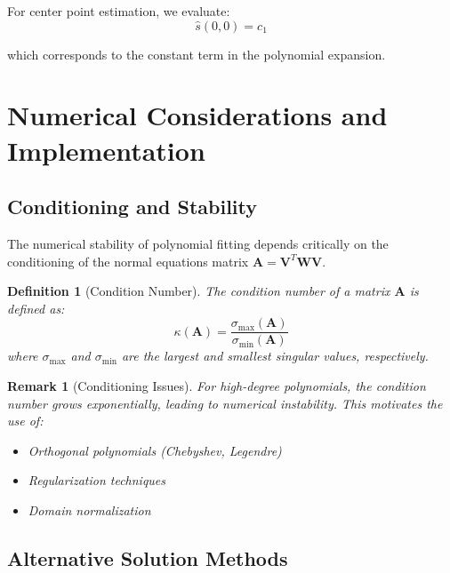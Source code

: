 \documentclass[12pt]{article}
\newtheorem{definition}[theorem]{Definition}
\newtheorem{remark}[theorem]{Remark}
\begin{document}
For center point estimation, we evaluate:
\begin{equation}
    \hat{s}(0, 0) = c_1
\end{equation}

which corresponds to the constant term in the polynomial expansion.

\newpage

\section{Numerical Considerations and Implementation}

\subsection{Conditioning and Stability}

The numerical stability of polynomial fitting depends critically on the conditioning of the normal equations matrix $\mathbf{A} = \mathbf{V}^T \mathbf{W} \mathbf{V}$.

\begin{definition}[Condition Number]
    The condition number of a matrix $\mathbf{A}$ is defined as:
    \begin{equation}
        \kappa(\mathbf{A}) = \frac{\sigma_{\max}(\mathbf{A})}{\sigma_{\min}(\mathbf{A})}
    \end{equation}
    where $\sigma_{\max}$ and $\sigma_{\min}$ are the largest and smallest singular values, respectively.
\end{definition}

\begin{remark}[Conditioning Issues]
    For high-degree polynomials, the condition number grows exponentially, leading to numerical instability. This motivates the use of:
    \begin{itemize}
        \item Orthogonal polynomials (Chebyshev, Legendre)
        \item Regularization techniques
        \item Domain normalization
    \end{itemize}
\end{remark}

\subsection{Alternative Solution Methods}
\end{document}
